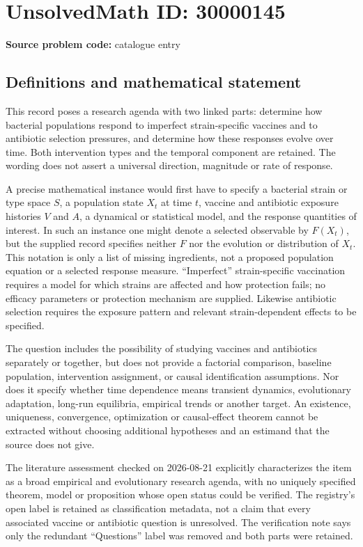 \documentclass[11pt]{article}
\begin{document}
\section*{UnsolvedMath ID: 30000145}
\textbf{Source problem code:} catalogue entry
\subsection{Definitions and mathematical statement}
This record poses a research agenda with two linked parts: determine how bacterial populations respond to imperfect strain-specific vaccines and to antibiotic selection pressures, and determine how these responses evolve over time. Both intervention types and the temporal component are retained. The wording does not assert a universal direction, magnitude or rate of response.

A precise mathematical instance would first have to specify a bacterial strain or type space \(S\), a population state \(X_t\) at time \(t\), vaccine and antibiotic exposure histories \(V\) and \(A\), a dynamical or statistical model, and the response quantities of interest. In such an instance one might denote a selected observable by \(F(X_t)\), but the supplied record specifies neither \(F\) nor the evolution or distribution of \(X_t\). This notation is only a list of missing ingredients, not a proposed population equation or a selected response measure. ``Imperfect'' strain-specific vaccination requires a model for which strains are affected and how protection fails; no efficacy parameters or protection mechanism are supplied. Likewise antibiotic selection requires the exposure pattern and relevant strain-dependent effects to be specified.

The question includes the possibility of studying vaccines and antibiotics separately or together, but does not provide a factorial comparison, baseline population, intervention assignment, or causal identification assumptions. Nor does it specify whether time dependence means transient dynamics, evolutionary adaptation, long-run equilibria, empirical trends or another target. An existence, uniqueness, convergence, optimization or causal-effect theorem cannot be extracted without choosing additional hypotheses and an estimand that the source does not give.

The literature assessment checked on 2026-08-21 explicitly characterizes the item as a broad empirical and evolutionary research agenda, with no uniquely specified theorem, model or proposition whose open status could be verified. The registry's open label is retained as classification metadata, not a claim that every associated vaccine or antibiotic question is unresolved. The verification note says only the redundant ``Questions'' label was removed and both parts were retained.
\end{document}
